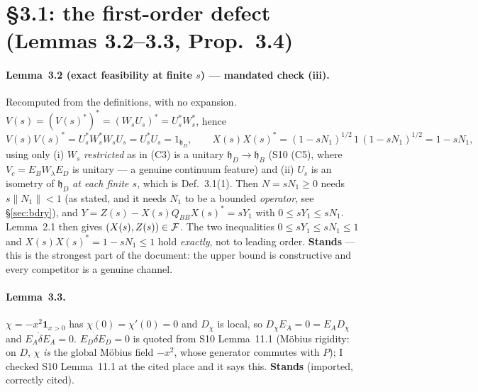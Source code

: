 \documentclass[11pt]{article}
\newcommand{\hh}{\mathfrak h}
\begin{document}
\section{\S3.1: the first-order defect (Lemmas 3.2--3.3, Prop.~3.4)}\label{sec:blocks}

\paragraph{Lemma~3.2 (exact feasibility at finite $s$) --- mandated check (iii).}
Recomputed from the definitions, with no expansion.  $V(s)=(V(s)^*)^*=(W_sU_s)^*=U_s^*W_s^*$,
hence
\[ V(s)V(s)^*=U_s^*W_s^*W_sU_s=U_s^*U_s=1_{\hh_D}, \qquad
   X(s)X(s)^*=(1-sN_1)^{1/2}\,1\,(1-sN_1)^{1/2}=1-sN_1 , \]
using only (i) $W_s$ \emph{restricted} as in (C3) is a unitary $\hh_D\to\hh_B$ (S10 (C5),
where $V_c=E_BW_\lambda E_D$ is unitary --- a genuine continuum feature) and (ii) $U_s$ is
an isometry of $\hh_D$ \emph{at each finite $s$}, which is Def.~3.1(1).  Then
$N=sN_1\ge0$ needs $s\|N_1\|<1$ (as stated, and it needs $N_1$ to be a bounded
\emph{operator}, see \S\ref{sec:bdry}), and $Y=Z(s)-X(s)Q_{BB}X(s)^*=sY_1$ with
$0\le sY_1\le sN_1$.  Lemma~2.1 then gives $(X(s),Z(s))\in\mathcal F$.  The two inequalities
$0\le sY_1\le sN_1\le1$ and $X(s)X(s)^*=1-sN_1\le1$ hold \emph{exactly}, not to leading
order.  \textbf{Stands} --- this is the strongest part of the document: the upper bound is
constructive and every competitor is a genuine channel.

\paragraph{Lemma~3.3.}  $\chi=-x^2\mathbf1_{x>0}$ has $\chi(0)=\chi'(0)=0$ and $D_\chi$ is
local, so $D_\chi E_A=0=E_AD_\chi$ and $E_A\dot\delta E_A=0$.  $E_D\dot\delta E_D=0$ is
quoted from S10 Lemma~11.1 (M\"obius rigidity: on $D$, $\chi$ \emph{is} the global M\"obius
field $-x^2$, whose generator commutes with $P$); I checked S10 Lemma~11.1 at the cited
place and it says this.  \textbf{Stands} (imported, correctly cited).
\end{document}
